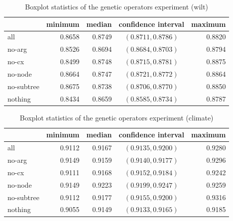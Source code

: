 \begin{table}[ht]
\centering
\caption{Boxplot statistics of the genetic operators experiment (wilt)}\label{tab04:exp2:wboxstats}
\begin{tabular}{lrrcr}
\toprule
{} &  minimum &  median &  confidence interval &  maximum \\
\midrule
all        &   0.8658 &  0.8749 &   $(0.8711,0.8786)$ &   0.8820 \\
no-arg     &   0.8526 &  0.8694 &   $(0.8684,0.8703)$ &   0.8794 \\
no-cx      &   0.8499 &  0.8748 &   $(0.8715,0.8781)$ &   0.8875 \\
no-node    &   0.8664 &  0.8747 &   $(0.8721,0.8772)$ &   0.8864 \\
no-subtree &   0.8675 &  0.8738 &   $(0.8706,0.8770)$ &   0.8850 \\
nothing    &   0.8434 &  0.8659 &   $(0.8585,0.8734)$ &   0.8787 \\
\bottomrule
\end{tabular}

\end{table}

\begin{table}[ht]
\centering
\caption{Boxplot statistics of the genetic operators experiment (climate)}\label{tab04:exp2:cboxstats}
\begin{tabular}{lrrcr}
\toprule
{} &  minimum & median &  confidence interval &  maximum \\
\midrule
all        &   0.9112 &  0.9167 &   $(0.9135, 0.9200)$ &   0.9280 \\
no-arg     &   0.9149 &  0.9159 &   $(0.9140, 0.9177)$ &   0.9296 \\
no-cx      &   0.9111 &  0.9168 &   $(0.9152, 0.9184)$ &   0.9242 \\
no-node    &   0.9149 &  0.9223 &   $(0.9199, 0.9247)$ &   0.9259 \\
no-subtree &   0.9112 &  0.9177 &   $(0.9155, 0.9200)$ &   0.9316 \\
nothing    &   0.9055 &  0.9149 &   $(0.9133, 0.9165)$ &   0.9185 \\
\bottomrule
\end{tabular}

\end{table}

